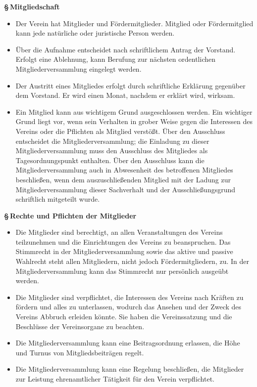 \documentclass[11pt]{article}
\def\items#1{{%
  \itcounter0%
  \begin{itemize}
  #1
  \end{itemize}
}}
\let\it\item%
\def\item{
  \advance\itcounter1%
  \it[(\the\itcounter)]
}
\def\paragraf#1{
  \advance\itcounter1%
  \par\medskip
  {\large\bfseries \S\,\the\itcounter\quad#1}
  \par\smallskip
}
\begin{document}
\paragraf{Mitgliedschaft}

\items{
   \item Der Verein hat Mitglieder und F{\"o}rdermitglieder. Mitglied oder
   F{\"o}rdermitglied kann jede nat\"urliche oder juristische Person werden.
   \item {\"U}ber die Aufnahme entscheidet nach schriftlichem Antrag der Vorstand.
       Erfolgt eine Ablehnung, kann Berufung zur n{\"a}chsten
       ordentlichen Mitgliederversammlung eingelegt werden.
   \item Der Austritt eines Mitgliedes erfolgt durch schriftliche Erkl{\"a}rung gegen{\"u}ber
       dem Vorstand. Er wird einen Monat, nachdem er erkl{\"a}rt wird, wirksam.
   \item Ein Mitglied kann aus wichtigem Grund ausgeschlossen werden. Ein
       wichtiger Grund liegt vor, wenn sein Verhalten in grober Weise gegen die
       Interessen des Vereins oder die Pflichten als Mitglied verst{\"o}{\ss}t.
       {\"U}ber den Ausschluss entscheidet die Mitgliederversammlung;
       die Einladung zu dieser Mitgliederversammlung muss den Ausschluss des
       Mitgliedes als Tagesordnungspunkt enthalten.
       {\"U}ber den Ausschluss kann die Mitgliederversammlung auch in
       Abwesenheit des betroffenen Mitgliedes beschlie{\ss}en, wenn
       dem auszuschlie{\ss}enden Mitglied mit der Ladung zur Mitgliederversammlung
       dieser Sachverhalt und der Ausschlie{\ss}ungsgrund schriftlich mitgeteilt wurde.
}

\paragraf{Rechte und Pflichten der Mitglieder}

\items{
   \item Die Mitglieder sind berechtigt, an allen Veranstaltungen des Vereins
       teilzunehmen und die Einrichtungen des Vereins zu beanspruchen. Das
       Stimmrecht in der Mitgliederversammlung sowie das aktive und passive
       Wahlrecht steht allen Mitgliedern, nicht jedoch F{\"o}rdermitgliedern, zu.
       In der Mitgliederversammlung kann das Stimmrecht nur pers{\"o}nlich ausge{\"u}bt werden.
   \item Die Mitglieder sind verpflichtet, die Interessen des Vereins nach Kr{\"a}ften zu
       f{\"o}rdern und alles zu unterlassen, wodurch das Ansehen und der Zweck des
       Vereins Abbruch erleiden k{\"o}nnte. Sie haben die Vereinssatzung und die
       Beschl{\"u}sse der Vereinsorgane zu beachten.
   \item Die Mitgliederversammlung kann eine Beitragsordnung erlassen, die H{\"o}he und
       Turnus von Mitgliedsbeitr{\"a}gen regelt.
   \item Die Mitgliederversammlung kann eine Regelung beschlie{\ss}en, die Mitglieder
       zur Leistung ehrenamtlicher T{\"a}tigkeit f{\"u}r den Verein verpflichtet.
}
\end{document}
